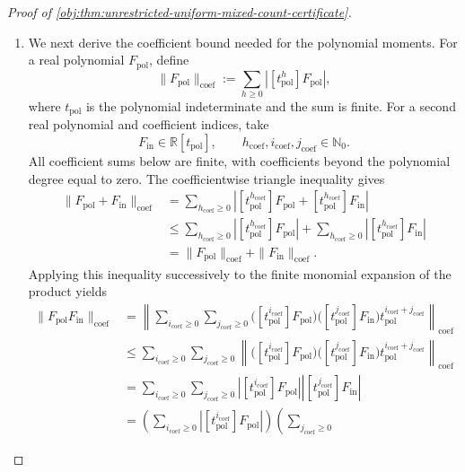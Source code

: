 \documentclass[11pt]{article}
\begin{document}
\begin{proof}[Proof of \cref{obj:thm:unrestricted-uniform-mixed-count-certificate}]
\begin{enumerate}
\item We next derive the coefficient bound needed for the polynomial
moments. For a real polynomial \(F_{\mathrm{pol}}\), define
\[
\|F_{\mathrm{pol}}\|_{\mathrm{coef}}
:=\sum_{h\ge0}|[t_{\mathrm{pol}}^h]F_{\mathrm{pol}}|,
\]
where \(t_{\mathrm{pol}}\) is the polynomial indeterminate and the sum is
finite. For a second real polynomial and coefficient indices, take
\[
F_{\mathrm{in}}\in\mathbb R[t_{\mathrm{pol}}],
\qquad
h_{\mathrm{coef}},i_{\mathrm{coef}},j_{\mathrm{coef}}\in\mathbb N_0.
\]
All coefficient sums below are finite, with coefficients beyond the
polynomial degree equal to zero. The coefficientwise triangle inequality
 gives
\[
\begin{aligned}
\|F_{\mathrm{pol}}+F_{\mathrm{in}}\|_{\mathrm{coef}}
&=\sum_{h_{\mathrm{coef}}\ge0}
\left|[t_{\mathrm{pol}}^{h_{\mathrm{coef}}}]F_{\mathrm{pol}}
+[t_{\mathrm{pol}}^{h_{\mathrm{coef}}}]F_{\mathrm{in}}\right|\\
&\le\sum_{h_{\mathrm{coef}}\ge0}
\left|[t_{\mathrm{pol}}^{h_{\mathrm{coef}}}]F_{\mathrm{pol}}\right|
+\sum_{h_{\mathrm{coef}}\ge0}
\left|[t_{\mathrm{pol}}^{h_{\mathrm{coef}}}]F_{\mathrm{in}}\right|\\
&=\|F_{\mathrm{pol}}\|_{\mathrm{coef}}
+\|F_{\mathrm{in}}\|_{\mathrm{coef}}.
\end{aligned}
\]
Applying this inequality successively to the finite monomial expansion
of the product yields
\[
\begin{aligned}
\|F_{\mathrm{pol}}F_{\mathrm{in}}\|_{\mathrm{coef}}
&=\left\|
\sum_{i_{\mathrm{coef}}\ge0}\sum_{j_{\mathrm{coef}}\ge0}
\bigl([t_{\mathrm{pol}}^{i_{\mathrm{coef}}}]F_{\mathrm{pol}}\bigr)
\bigl([t_{\mathrm{pol}}^{j_{\mathrm{coef}}}]F_{\mathrm{in}}\bigr)
 t_{\mathrm{pol}}^{i_{\mathrm{coef}}+j_{\mathrm{coef}}}
\right\|_{\mathrm{coef}}\\
&\le\sum_{i_{\mathrm{coef}}\ge0}\sum_{j_{\mathrm{coef}}\ge0}
\left\|
\bigl([t_{\mathrm{pol}}^{i_{\mathrm{coef}}}]F_{\mathrm{pol}}\bigr)
\bigl([t_{\mathrm{pol}}^{j_{\mathrm{coef}}}]F_{\mathrm{in}}\bigr)
 t_{\mathrm{pol}}^{i_{\mathrm{coef}}+j_{\mathrm{coef}}}
\right\|_{\mathrm{coef}}\\
&=\sum_{i_{\mathrm{coef}}\ge0}\sum_{j_{\mathrm{coef}}\ge0}
\left|[t_{\mathrm{pol}}^{i_{\mathrm{coef}}}]F_{\mathrm{pol}}\right|
\left|[t_{\mathrm{pol}}^{j_{\mathrm{coef}}}]F_{\mathrm{in}}\right|\\
&=\left(\sum_{i_{\mathrm{coef}}\ge0}
\left|[t_{\mathrm{pol}}^{i_{\mathrm{coef}}}]F_{\mathrm{pol}}\right|\right)
\left(\sum_{j_{\mathrm{coef}}\ge0}

\end{aligned}\]
\end{enumerate}
\end{proof}
\end{document}
